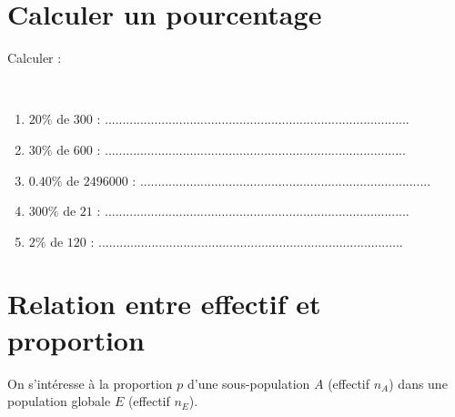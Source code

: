 	\section{Calculer un pourcentage}
	Calculer :
	\begin{questions}
		
	
		\question[5] \ 
		
		\begin{enumerate}[label=\alph*)]
			
			\item $20 \%$ de $\num{300}$ :  ......................................................................................
			\item $30 \%$ de $\num{600}$ : .....................................................................................
			\item $\num{0.40} \%$ de $\num{2496000}$ : ..................................................................................
			\item $300 \%$ de $\num{21}$ : ......................................................................................
			\item $2 \%$ de $\num{120}$ : ......................................................................................
		\end{enumerate}
	\end{questions}
	
	
\section{Relation entre effectif et proportion}

On s'intéresse à la proportion $p$ d'une sous-population $A$ (effectif $n_A$) dans une population globale $E$ (effectif $n_E$).

